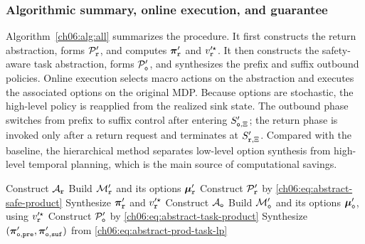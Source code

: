 \subsubsection{Algorithmic summary, online execution, and guarantee}
\label{ch06:subsec:summary}

Algorithm~\ref{ch06:alg:all} summarizes the procedure. It first constructs
the return abstraction, forms \(\mathcal{P}'_{\textup{\texttt{r}}}\), and
computes \(\boldsymbol{\pi}'_{\textup{\texttt{r}}}\) and
\(v'^{\star}_{\textup{\texttt{r}}}\). It then constructs the safety-aware
task abstraction, forms \(\mathcal{P}'_{\textup{\texttt{o}}}\), and
synthesizes the prefix and suffix outbound policies. Online execution selects
macro actions on the abstraction and executes the associated options on the
original MDP. Because options are stochastic, the high-level policy is
reapplied from the realized sink state. The outbound phase switches from prefix
to suffix control after entering \(S'_{\textup{\texttt{o}},\Xi}\); the
return phase is invoked only after a return request and terminates at
\(S'_{\textup{\texttt{r}},\Xi}\). Compared with the baseline, the
hierarchical method separates low-level option synthesis from high-level
temporal planning, which is the main source of computational savings.

\begin{algorithm}[t]
\caption{Hierarchical synthesis algorithm}
\label{ch06:alg:all}
\LinesNumbered
{}
Construct \(\mathcal{A}_{\textup{\texttt{r}}}\)\;
Build \(\mathcal{M}'_{\textup{\texttt{r}}}\) and its options
\(\boldsymbol{\mu}'_{\textup{\texttt{r}}}\)\;
Construct \(\mathcal{P}'_{\textup{\texttt{r}}}\) by
\eqref{ch06:eq:abstract-safe-product}\;
Synthesize \(\boldsymbol{\pi}'_{\textup{\texttt{r}}}\) and
\(v'^{\star}_{\textup{\texttt{r}}}\)\;
Construct \(\mathcal{A}_{\textup{\texttt{o}}}\)\;
Build \(\mathcal{M}'_{\textup{\texttt{o}}}\) and its options
\(\boldsymbol{\mu}'_{\textup{\texttt{o}}}\), using
\(v'^{\star}_{\textup{\texttt{r}}}\)\;
Construct \(\mathcal{P}'_{\textup{\texttt{o}}}\) by
\eqref{ch06:eq:abstract-task-product}\;
Synthesize
\((\boldsymbol{\pi}'_{\textup{\texttt{o}},\texttt{pre}},
\boldsymbol{\pi}'_{\textup{\texttt{o}},\texttt{suf}})\) from
\eqref{ch06:eq:abstract-prod-task-lp}\;
\end{algorithm}


